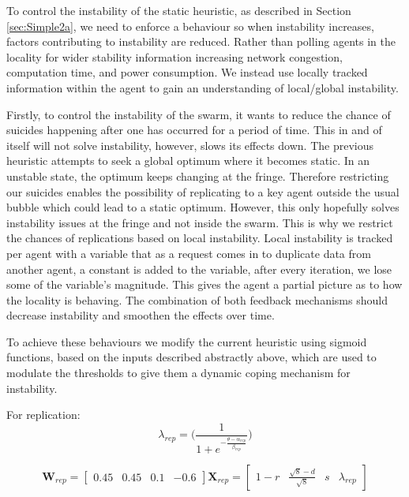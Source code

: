 \documentclass{UoYCSproject}
\begin{document}
To control the instability of the static heuristic, as described in Section \ref{sec:Simple2a}, we need to enforce a behaviour so when instability increases, factors contributing to instability are reduced.
Rather than polling agents in the locality for wider stability information increasing network congestion, computation time, and power consumption.
We instead use locally tracked information within the agent to gain an understanding of local/global instability.

Firstly, to control the instability of the swarm, it wants to reduce the chance of suicides happening after one has occurred for a period of time.
This in and of itself will not solve instability, however, slows its effects down.
The previous heuristic attempts to seek a global optimum where it becomes static.
In an unstable state, the optimum keeps changing at the fringe.
Therefore restricting our suicides enables the possibility of replicating to a key agent outside the usual bubble which could lead to a static optimum.
However, this only hopefully solves instability issues at the fringe and not inside the swarm.
This is why we restrict the chances of replications based on local instability.
Local instability is tracked per agent with a variable that as a request comes in to duplicate data from another agent, a constant is added to the variable, after every iteration, we lose some of the variable's magnitude.
This gives the agent a partial picture as to how the locality is behaving.
The combination of both feedback mechanisms should decrease instability and smoothen the effects over time.

To achieve these behaviours we modify the current heuristic using sigmoid functions, based on the inputs described abstractly above, which are used to modulate the thresholds to give them a dynamic coping mechanism for instability.

For replication:
\begin{equation}
\label{eq:1}
\lambda_{rep} = \big( \frac{1}{1+ e^{- \frac{ \theta - \alpha_{rep} }{ \beta_{rep} } } } \big)
\end{equation}

\begin{equation}
\label{eq:100}
\textbf{W}_{rep} = \begin{bmatrix}0.45 & 0.45 & 0.1 & -0.6 \end{bmatrix}
\textbf{X}_{rep} = \begin{bmatrix} 1-r & \frac{\sqrt{8}-d}{\sqrt{8}} & s & \lambda_{rep} \end{bmatrix}
\end{equation}
\end{document}
